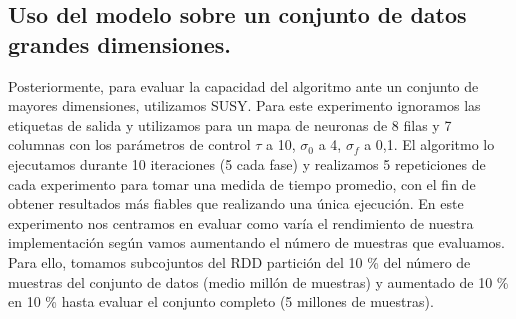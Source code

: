 \subsection{Uso del modelo sobre un conjunto de datos grandes dimensiones.}
Posteriormente, para evaluar la capacidad del algoritmo ante un conjunto de mayores dimensiones, utilizamos SUSY. Para este experimento ignoramos las etiquetas de salida y utilizamos para un mapa de neuronas de 8 filas y 7 columnas con los parámetros de control $\tau$ a 10, $\sigma_0$ a 4, $\sigma_f$ a 0,1. El algoritmo lo ejecutamos durante 10 iteraciones (5 cada fase) y realizamos 5 repeticiones de cada experimento para tomar una medida de tiempo promedio, con el fin de obtener resultados más fiables que realizando una única ejecución. En este experimento nos centramos en evaluar como varía el rendimiento de nuestra implementación según vamos aumentando el número de muestras que evaluamos. Para ello, tomamos subcojuntos del RDD partición del 10 \% del número de muestras del conjunto de datos (medio millón de muestras) y aumentado de 10 \% en 10 \% hasta evaluar el conjunto completo (5 millones de muestras).\\

